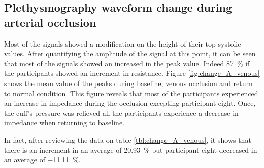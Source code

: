 \subsection{Plethysmography waveform change during arterial occlusion}
\label{section5.3.2}
Most of the signals showed a modification on the height of their top systolic values. After quantifying the amplitude of the signal at this point, it can be seen that most of the signals showed an increased in the peak value. Indeed \SI{87}{\percent} if the participants showed an increment in resistance. Figure \ref{fig:change_A_venous} shows the mean value of the peaks during baseline, venous occlusion and return to normal condition. This figure reveals that most of the participants experienced an increase in impedance during the occlusion excepting participant eight. Once, the cuff's pressure was relieved all the participants experience a decrease in impedance when returning to baseline. 

In fact, after reviewing the data on table \ref{tbl:change_A_venous}, it shows that there is an increment in an average of  \SI{20.93}{\percent} but participant eight decreased in an average of \SI{-11.11}{\percent}.

